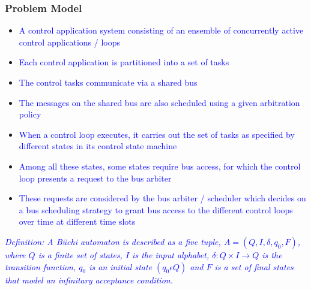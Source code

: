 \begin{frame}
\frametitle{Problem Model}

\begin{itemize}
\item \tiny{\textcolor{blue}{ A control application system consisting of
an ensemble of concurrently active control applications / loops}}

\item \tiny{\textcolor{blue}{ Each control
application is partitioned into a set of tasks }}

\item \tiny{\textcolor{blue}{ The control tasks communicate via
a shared bus}}
\item \tiny{\textcolor{blue}{ The messages on the shared bus are also scheduled using a given
arbitration policy}}

\item \tiny{\textcolor{blue}{ When a control loop executes, it carries out the set of tasks as
specified by different states in its control state machine }}

\item \tiny{\textcolor{blue}{ Among all these states,
some states require bus access, for which the control loop presents a request to
the bus arbiter}}

\item \tiny{\textcolor{blue}{ These requests are considered by the bus arbiter / scheduler
which decides on a bus scheduling strategy to grant bus access to the different
control loops over time at different time slots}}
\end{itemize}


\tiny{\textcolor{blue}{\textit{Definition: A B\"{u}chi automaton is described as a five tuple, $A = (Q, I, \delta, q_0 , F )$,
where $Q$ is a finite set of states, $I$ is the input alphabet, $\delta : Q \times I \rightarrow Q$ is the
transition function, $q_0$ is an initial state $(q_0 \epsilon Q)$ and $F$ is a set of final states
that model an infinitary acceptance condition.}}}\\




\end{frame}
